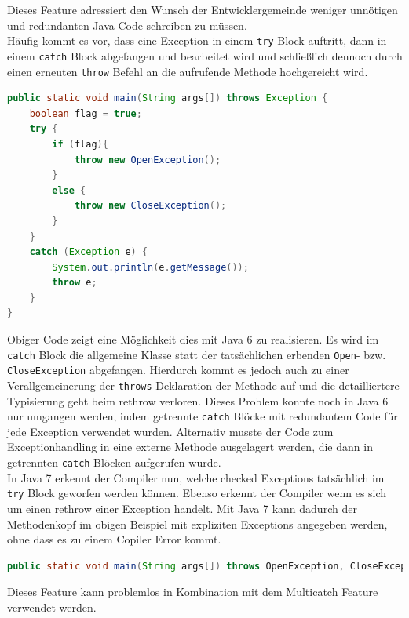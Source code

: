 \documentclass[times, 10pt,twocolumn]{article}
\begin{document}
Dieses Feature adressiert den Wunsch der Entwicklergemeinde weniger unnötigen und redundanten Java Code schreiben zu müssen.\cite{sbJ7exeptions}\\

Häufig kommt es vor, dass eine Exception in einem \texttt{try} Block auftritt, dann in einem \texttt{catch} Block abgefangen und bearbeitet wird und schließlich dennoch durch einen erneuten \texttt{throw} Befehl an die aufrufende Methode hochgereicht wird.

\begin{lstlisting}[language=java,breaklines=true]
public static void main(String args[]) throws Exception {
    boolean flag = true;
    try {
        if (flag){
            throw new OpenException();
        }
        else {
            throw new CloseException();
        }
    }
    catch (Exception e) {
        System.out.println(e.getMessage());
        throw e;
    }
}
\end{lstlisting}

Obiger Code\cite{sbJ7exeptions} zeigt eine Möglichkeit dies mit Java 6 zu realisieren. Es wird im \texttt{catch} Block die allgemeine  Klasse statt der tatsächlichen erbenden \texttt{Open}- bzw. \texttt{CloseException} abgefangen. Hierdurch kommt es jedoch auch zu einer Verallgemeinerung der \texttt{throws} Deklaration der Methode auf  und die detailliertere Typisierung geht beim rethrow verloren. Dieses Problem konnte noch in Java 6 nur umgangen werden, indem getrennte \texttt{catch} Blöcke mit redundantem Code für jede Exception verwendet wurden. Alternativ musste der Code zum Exceptionhandling in eine externe Methode ausgelagert werden, die dann in getrennten \texttt{catch} Blöcken aufgerufen wurde.\cite{scjp6}\\

In Java 7 erkennt der Compiler nun, welche checked Exceptions tatsächlich im \texttt{try} Block geworfen werden können. Ebenso erkennt der Compiler wenn es sich um einen rethrow einer Exception handelt. Mit Java 7 kann dadurch der Methodenkopf im obigen Beispiel mit expliziten Exceptions angegeben werden, ohne dass es zu einem Copiler Error kommt\cite{sbJ7exeptions}.

\begin{lstlisting}[language=java,breaklines=true]
public static void main(String args[]) throws OpenException, CloseException
\end{lstlisting}

Dieses Feature kann problemlos in Kombination mit dem Multicatch Feature verwendet werden.
\end{document}
